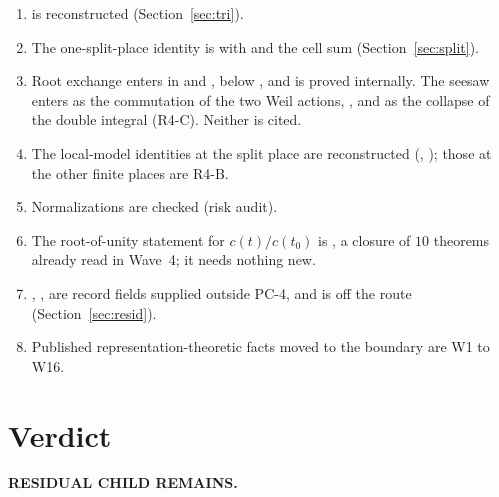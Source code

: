 \documentclass[11pt]{article}
\begin{document}
\begin{enumerate}[leftmargin=*,itemsep=2pt]
\item {} is reconstructed (Section~\ref{sec:tri}).
\item The one-split-place identity is  with  and the cell sum (Section~\ref{sec:split}).
\item Root exchange enters in  and , below , and is proved internally. The seesaw enters as the commutation of the two Weil actions, , and as the collapse of the double integral (R4-C). Neither is cited.
\item The local-model identities at the split place are reconstructed (, ); those at the other finite places are R4-B.
\item Normalizations are checked (risk audit).
\item The root-of-unity statement for $c(t)/c(t_0)$ is , a closure of $10$ theorems already read in Wave~4; it needs nothing new.
\item {}, ,  are record fields supplied outside PC-4, and  is off the route (Section~\ref{sec:resid}).
\item Published representation-theoretic facts moved to the boundary are W1 to W16.
\end{enumerate}

\section*{Verdict}

\textbf{RESIDUAL CHILD REMAINS.}
\end{document}
